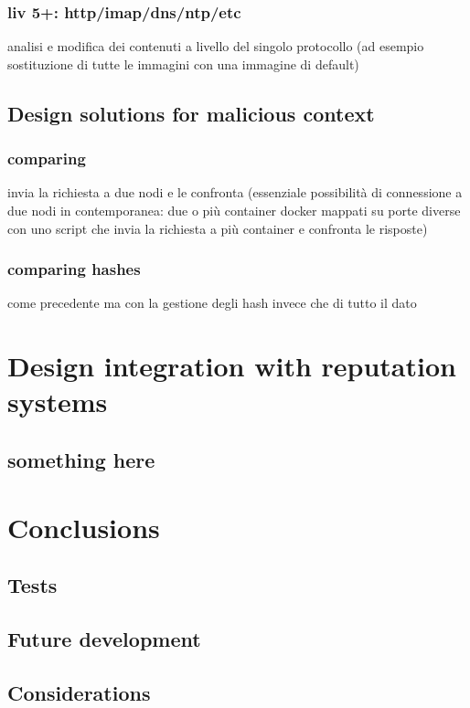 \documentclass[]{article}
\begin{document}
		 	\subsubsection{liv 5+: http/imap/dns/ntp/etc}
				analisi e modifica dei contenuti a livello del singolo protocollo (ad esempio sostituzione di tutte le immagini con una immagine di default)
			
	\subsection{Design solutions for malicious context}
		\subsubsection{comparing}
		invia la richiesta a due nodi e le confronta (essenziale possibilità di connessione a due nodi in contemporanea: due o più container docker mappati su porte diverse con uno script che invia la richiesta a più container e confronta le risposte)
		\subsubsection{comparing hashes}
		come precedente ma con la gestione degli hash invece che di tutto il dato
	\section{Design integration with reputation systems}
	
	\subsection{something here}
	
		
\section{Conclusions}
	\subsection{Tests}
	\subsection{Future development}
	\subsection{Considerations}

	\pagebreak
\end{document}
